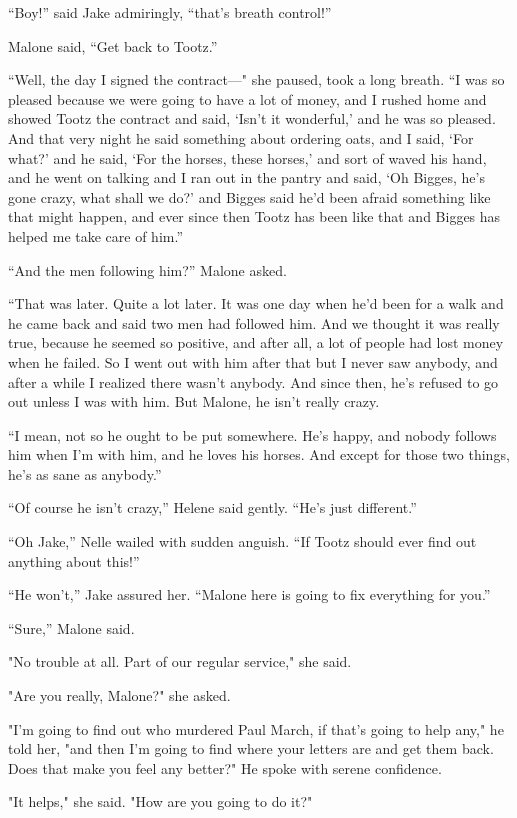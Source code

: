 \documentclass{novel}
\begin{document}
“Boy!” said Jake admiringly, “that’s breath control!”

Malone said, “Get back to Tootz.”

“Well, the day I signed the contract—" she paused, took a long breath. “I was so pleased because we were going to have a lot of money, and I rushed home and showed Tootz the contract and said, ‘Isn’t it wonderful,’ and he was so pleased. And that very night he said something about ordering oats, and I said, ‘For what?’ and he said, ‘For the horses, these horses,’ and sort of waved his hand, and he went on talking and I ran out in the pantry and said, ‘Oh Bigges, he’s gone crazy, what shall we do?’ and Bigges said he’d been afraid something like that might happen, and ever since then Tootz has been like that and Bigges has helped me take care of him.”

“And the men following him?” Malone asked.

“That was later. Quite a lot later. It was one day when he’d been for a walk and he came back and said two men had followed him. And we thought it was really true, because he seemed so positive, and after all, a lot of people had lost money when he failed. So I went out with him after that but I never saw anybody, and after a while I realized there wasn’t anybody. And since then, he’s refused to go out unless I was with him. But Malone, he isn’t really crazy.

“I mean, not so he ought to be put somewhere. He’s happy, and nobody follows him when I’m with him, and he loves his horses. And except for those two things, he’s as sane as anybody.”

“Of course he isn’t crazy,” Helene said gently. “He’s just different.”

“Oh Jake,” Nelle wailed with sudden anguish. “If Tootz should ever find out anything about this!”

“He won’t,” Jake assured her. “Malone here is going to fix everything for you.”

“Sure,” Malone said.

"No trouble at all. Part of our regular service," she said.

"Are you really, Malone?" she asked.

"I’m going to find out who murdered Paul March, if that’s going to help any," he told her, "and then I’m going to find where your letters are and get them back. Does that make you feel any better?" He spoke with serene confidence.

"It helps," she said. "How are you going to do it?"
\end{document}
